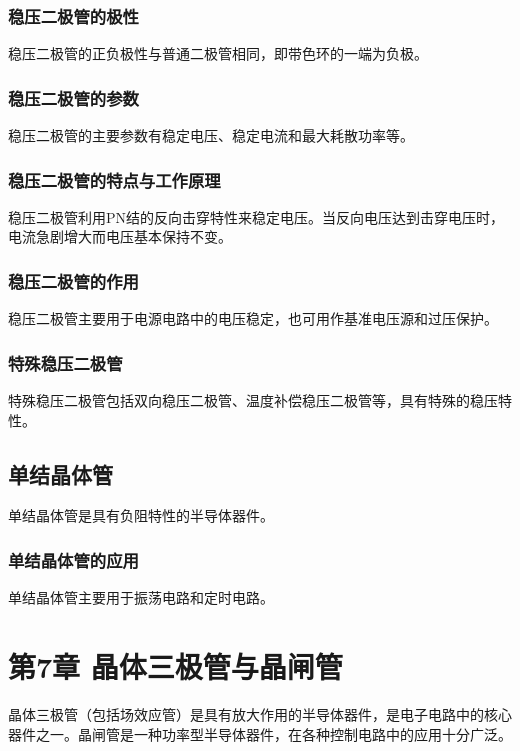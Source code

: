 \documentclass[12pt,UTF8]{ctexbook}
\begin{document}
\subsection{稳压二极管的极性}

稳压二极管的正负极性与普通二极管相同，即带色环的一端为负极。

\subsection{稳压二极管的参数}

稳压二极管的主要参数有稳定电压、稳定电流和最大耗散功率等。

\subsection{稳压二极管的特点与工作原理}

稳压二极管利用PN结的反向击穿特性来稳定电压。当反向电压达到击穿电压时，电流急剧增大而电压基本保持不变。

\subsection{稳压二极管的作用}

稳压二极管主要用于电源电路中的电压稳定，也可用作基准电压源和过压保护。

\subsection{特殊稳压二极管}

特殊稳压二极管包括双向稳压二极管、温度补偿稳压二极管等，具有特殊的稳压特性。

\section{单结晶体管}

单结晶体管是具有负阻特性的半导体器件。

\subsection{单结晶体管的应用}

单结晶体管主要用于振荡电路和定时电路。

\chapter{第7章 晶体三极管与晶闸管}

晶体三极管（包括场效应管）是具有放大作用的半导体器件，是电子电路中的核心器件之一。晶闸管是一种功率型半导体器件，在各种控制电路中的应用十分广泛。
\end{document}
